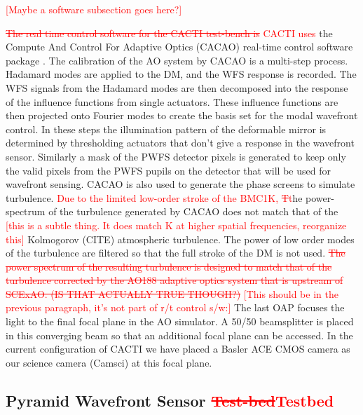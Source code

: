 \documentclass[12pt]{spieman}  %
\newcommand{\jrmadd}[1]{\textcolor{red}{#1}}
\newcommand{\jrmrmv}[1]{\textcolor{red}{\sout{#1}}}
\newcommand{\jrmcom}[1]{\textcolor{red}{[#1]}}
\begin{document}
\begin{spacing}{2}
\jrmcom{Maybe a software subsection goes here?}

\jrmrmv{The real time control software for the CACTI test-bench is } \jrmadd{CACTI uses} the Compute And Control For Adaptive Optics (CACAO) real-time control software package \cite{guyon2018compute}. The calibration of the AO system by CACAO is a multi-step process. Hadamard modes are applied to the DM, and the WFS response is recorded. The WFS signals from the Hadamard modes are then decomposed into the response of the influence functions from single actuators. These influence functions are then projected onto Fourier modes to create the basis set for the modal wavefront control. In these steps the illumination pattern of the deformable mirror is determined by thresholding actuators that don't give a response in the wavefront sensor. Similarly a mask of the PWFS detector pixels is generated to keep only the valid pixels from the PWFS pupils on the detector that will be used for wavefront sensing. CACAO is also used to generate the phase screens to simulate turbulence. \jrmadd{Due to the limited low-order stroke of the BMC1K,} \jrmrmv{T}\jrmadd{t}he power-spectrum of the turbulence generated by CACAO does not match that of the \jrmcom{this is a subtle thing.  It does match K at higher spatial frequencies, reorganize this} Kolmogorov (CITE) atmospheric turbulence. The power of low order modes of the turbulence are filtered so that the full stroke of the DM is not used. \jrmrmv{The power spectrum of the resulting turbulence is designed to match that of the turbulence corrected by the AO188\cite{clergeon2018subaru} adaptive optics system that is upstream of SCExAO. (IS THAT ACTUALLY TRUE THOUGH?)} \jrmcom{This should be in the previous paragraph, it's not part of r/t control s/w:} The last OAP focuses the light to the final focal plane in the AO simulator. A 50/50 beamsplitter is placed in this converging beam so that an additional focal plane can be accessed. In the current configuration of CACTI we have placed a Basler ACE CMOS camera as our science camera (Camsci) at this focal plane.


\subsection{Pyramid Wavefront Sensor \jrmrmv{Test-bed}\jrmadd{Testbed}}


\end{spacing}
\end{document}
